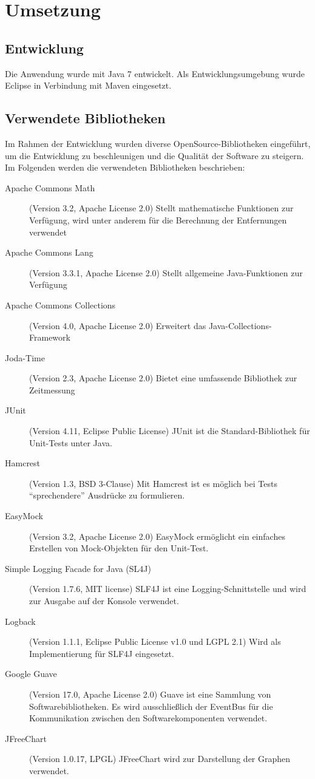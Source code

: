 \section{Umsetzung}
\subsection{Entwicklung}
Die Anwendung wurde mit Java 7 entwickelt. Als Entwicklungsumgebung wurde Eclipse in Verbindung mit Maven eingesetzt. 

\subsection{Verwendete Bibliotheken}
Im Rahmen der Entwicklung wurden diverse OpenSource-Bibliotheken eingeführt, um die Entwicklung zu beschleunigen und die Qualität der Software zu steigern. Im Folgenden werden die verwendeten Bibliotheken beschrieben:
\begin{description}
 \item[Apache Commons Math] (Version 3.2, Apache License 2.0) \cite{apache:CommonsMath} Stellt mathematische Funktionen zur Verfügung, wird unter anderem für die Berechnung der Entfernungen verwendet
 \item[Apache Commons Lang] (Version 3.3.1, Apache License 2.0) \cite{apache:CommonsLang} Stellt allgemeine Java-Funktionen zur Verfügung
 \item[Apache Commons Collections] (Version 4.0, Apache License 2.0) \cite{apache:CommonsCollection} Erweitert das Java-Collec\-tions-Framework
 \item[Joda-Time] (Version 2.3, Apache License 2.0) \cite{joda:jodatime} Bietet eine umfassende Bibliothek zur Zeitmessung
 \item[JUnit] (Version 4.11, Eclipse Public License) \cite{junit:junit} JUnit ist die Standard-Bibliothek für Unit-Tests unter Java.
 \item[Hamcrest] (Version 1.3, BSD 3-Clause) \cite{hamcrest:hamcrest} Mit Hamcrest ist es möglich bei Tests "`sprechendere"' Ausdrücke zu formulieren.
 \item[EasyMock] (Version 3.2, Apache License 2.0) \cite{easymock:easymock} EasyMock ermöglicht ein einfaches Erstellen von Mock-Objekten für den Unit-Test.
 \item[Simple Logging Facade for Java (SL4J)] (Version 1.7.6, MIT license) \cite{qos:slfj} SLF4J ist eine Log\-ging-Schnittstelle und wird zur Ausgabe auf der Konsole verwendet.
 \item[Logback] (Version 1.1.1, Eclipse Public License v1.0 und LGPL 2.1) \cite{qos:logback} Wird als Implementierung für SLF4J eingesetzt.
 \item[Google Guave] (Version 17.0, Apache License 2.0) \cite{google:guave} Guave ist eine Sammlung von Softwarebibliotheken. Es wird ausschließlich der EventBus für die Kommunikation zwischen den Softwarekomponenten verwendet.
 \item[JFreeChart] (Version 1.0.17, LPGL) \cite{ObjectRefineryLimited:JFreeChart} JFreeChart wird zur Darstellung der Graphen verwendet.
\end{description}

